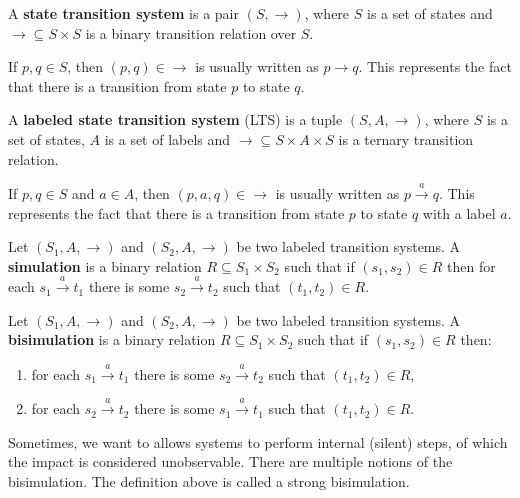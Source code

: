 \begin{definition}
  A {\bf state transition system} is a pair $(S, \rightarrow)$, where $S$ is a set of states and $\rightarrow\subseteq S\times S$ is a binary transition relation over $S$.
\end{definition}
  If $p,q\in S$, then $(p,q)\in \rightarrow$ is usually written as $p\rightarrow q$. This represents the fact that there is a transition from state $p$ to state $q$.

\begin{definition}
  A {\bf labeled state transition system} (LTS) is a tuple $(S, A, \rightarrow)$, where $S$ is a set of states, $A$ is a set of labels and $\rightarrow\subseteq S\times A\times S$ is a ternary transition relation.
\end{definition}

If $p,q\in S$ and $a\in A$, then $(p,a,q)\in \rightarrow$ is usually written as $p\xrightarrow{a} q$. This represents the fact that there is a transition from state $p$ to state $q$ with a label $a$.

\begin{definition}
  Let $(S_1, A, \rightarrow)$ and $(S_2, A, \rightarrow)$ be two labeled transition systems.
  A {\bf simulation} is a binary relation $R\subseteq S_1\times S_2$ such that if $(s_1,s_2)\in R$ then for each $s_1\xrightarrow{a} t_1$ there is some $s_2\xrightarrow{a} t_2$ such that $(t_1, t_2)\in R$.
\end{definition}

\begin{definition}
  Let $(S_1, A, \rightarrow)$ and $(S_2, A, \rightarrow)$ be two labeled transition systems.
  A {\bf bisimulation} is a binary relation $R\subseteq S_1\times S_2$ such that if $(s_1,s_2)\in R$ then:
  \begin{enumerate}
    \item for each $s_1\xrightarrow{a} t_1$ there is some $s_2\xrightarrow{a} t_2$ such that $(t_1, t_2)\in R$,
    \item for each $s_2\xrightarrow{a} t_2$ there is some $s_1\xrightarrow{a} t_1$ such that $(t_1, t_2)\in R$.
  \end{enumerate}
\end{definition}

Sometimes, we want to allows systems to perform internal (silent) steps, of which the impact is considered unobservable. There are multiple notions of the bisimulation. The definition above is called a strong bisimulation.

